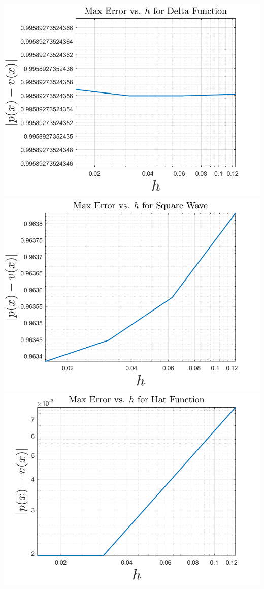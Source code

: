 \documentclass{article}
\begin{document}
\begin{center}
    \includegraphics[scale = 0.3]{deltafunctionHerr.png}
    \includegraphics[scale = 0.3]{squarewaveHerr.png}
    \newline
    \includegraphics[scale = 0.4]{hatfunctionHplot.png}
\end{center}
\end{document}

